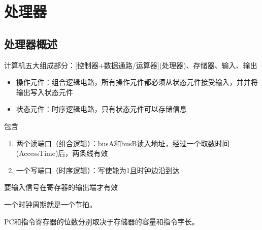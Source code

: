 
\section{处理器}
\subsection{处理器概述}
计算机五大组成部分：[控制器+数据通路/运算器](处理器)、存储器、输入、输出
\begin{itemize}
	\item 操作元件：组合逻辑电路，所有操作元件都必须从状态元件接受输入，并并将输出写入状态元件
	\item 状态元件：时序逻辑电路，只有状态元件可以存储信息
\end{itemize}
\begin{definition}
包含
\begin{enumerate}
	\item 两个读端口（组合逻辑）：busA和busB读入地址，经过一个取数时间(AccessTime)后，两条线有效
	\item 一个写端口（时序逻辑）：写使能为1且时钟边沿到达
\end{enumerate}
要输入信号在寄存器的输出端才有效
\end{definition}
\par 一个时钟周期就是一个节拍。
\par PC和指令寄存器的位数分别取决于存储器的容量和指令字长。

